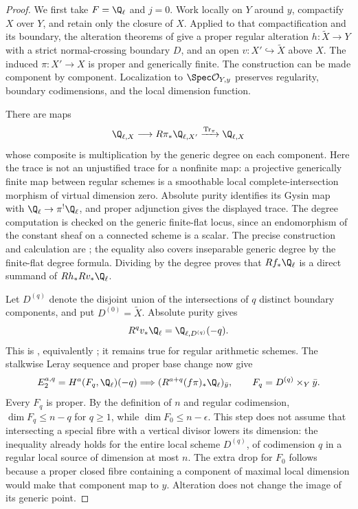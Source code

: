 \begin{proof}
We first take $F=\Q_\ell$ and $j=0$. Work locally on $Y$ around $y$, compactify $X$ over $Y$, and retain only the closure of $X$. Applied to that compactification and its boundary, the alteration theorems of \citet[Theorem 4.1 for varieties over fields; Theorem 8.2 for arithmetic schemes]{c_dejong1996} give a proper regular alteration $h:\widetilde X\to Y$ with a strict normal-crossing boundary $D$, and an open $v:X'\hookrightarrow\widetilde X$ above $X$. The induced $\pi:X'\to X$ is proper and generically finite. The construction can be made component by component. Localization to $\Spec\mathcal O_{Y,y}$ preserves regularity, boundary codimensions, and the local dimension function.

There are maps
\[
 \Q_{\ell,X}\longrightarrow R\pi_*\Q_{\ell,X'}
 \xrightarrow{\operatorname{Tr}_\pi}\Q_{\ell,X}
\]
whose composite is multiplication by the generic degree on each component. Here the trace is not an unjustified trace for a nonfinite map: a projective generically finite map between regular schemes is a smoothable local complete-intersection morphism of virtual dimension zero. Absolute purity identifies its Gysin map with $\Q_\ell\to\pi^!\Q_\ell$, and proper adjunction gives the displayed trace. The degree computation is checked on the generic finite-flat locus, since an endomorphism of the constant sheaf on a connected scheme is a scalar. The precise construction and calculation are \citet[Corollary 3.1.2, Lemmas 3.5.8--3.5.10, and Proposition 2.5.13]{c_riou2014}; the equality also covers inseparable generic degree by the finite-flat degree formula. Dividing by the degree proves that $Rf_*\Q_\ell$ is a direct summand of $Rh_*Rv_*\Q_\ell$.

Let $D^{(q)}$ denote the disjoint union of the intersections of $q$ distinct boundary components, and put $D^{(0)}=\widetilde X$. Absolute purity gives
\[
 R^qv_*\Q_\ell=\Q_{\ell,D^{(q)}}(-q).
\]
This is \citet[Corollary 3.1.4]{c_riou2014}, equivalently \citet[Theorem 2.1.2]{c_pillonistroh2014}; it remains true for regular arithmetic schemes. The stalkwise Leray sequence and proper base change now give
\[
 E_2^{a,q}=H^a(F_q,\Q_\ell)(-q)
 \Longrightarrow (R^{a+q}(f\pi)_*\Q_\ell)_{\bar y},
 \qquad F_q=D^{(q)}\times_Y\bar y.
\]
Every $F_q$ is proper. By the definition of $n$ and regular codimension, $\dim F_q\leq n-q$ for $q\geq1$, while $\dim F_0\leq n-\epsilon$. This step does not assume that intersecting a special fibre with a vertical divisor lowers its dimension: the inequality already holds for the entire local scheme $D^{(q)}$, of codimension $q$ in a regular local source of dimension at most $n$. The extra drop for $F_0$ follows because a proper closed fibre containing a component of maximal local dimension would make that component map to $y$. Alteration does not change the image of its generic point.


\end{proof}
